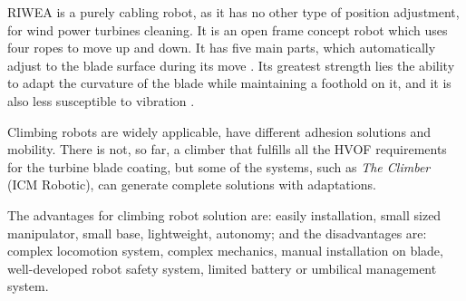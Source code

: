 RIWEA is a purely cabling robot, as it has no other type of position
adjustment, for wind power turbines cleaning. It is an open frame concept robot
which uses four ropes to move up and down. It has five main parts, which
automatically adjust to the blade surface during its move
\citep{jeon2012maintenance}. Its greatest strength lies the ability to adapt the
curvature of the blade while maintaining a foothold on it, and it is also less
susceptible to vibration \citep{riwea}.

Climbing robots are widely applicable, have different adhesion solutions and
mobility. There is not, so far, a climber that fulfills all the HVOF
requirements for the turbine blade coating, but some of the systems, such as
\emph{The Climber} (ICM Robotic), can generate complete solutions with
adaptations.

The advantages for climbing robot solution are: easily installation, small sized
manipulator, small base, lightweight, autonomy; and the disadvantages are:
complex locomotion system, complex mechanics, manual installation on blade,
well-developed robot safety system, limited battery or umbilical management
system. 
